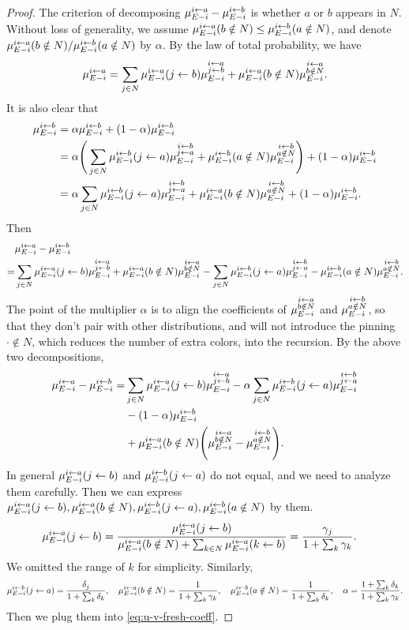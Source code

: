 \begin{proof}
    The criterion of decomposing $\ma-\mb$ is whether
    $a$ or $b$ appears in $N$.
    Without loss of generality, we assume $\pan\le\pbn$,
    and denote $\pan/\pbn$ by $\alpha$.
    By the law of total probability, we have
    \begin{align}
        \ma = \sjn\pab\mab + \pan\man.
    \end{align}
    It is also clear that
    \begin{align*}
        \mb
          &= \alpha \mb + (1-\alpha) \mb
        \\&= \alpha \Bigg(\sjn\pba\mba + \pbn\mbn\Bigg)
         + (1-\alpha) \mb
        \\&= \alpha \sjn\pba\mba + \pan\mbn + (1-\alpha)\mb.
    \end{align*}
    Then
    \begin{align*}
        &\ma - \mb
        \\=&\sjn \pab\mab + \pan \man -\sjn\pba\mba-\pbn\mbn.
    \end{align*}
    The point of the multiplier $\alpha$ is to align the coefficients
    of $\man$ and $\mbn$, so that they don't pair with other distributions,
    and will not introduce the pinning $\cdot\notin N$, which reduces the 
    number of extra colors, into the recursion.
    By the above two decompositions,
    \begin{align}
           \ma - \mb
          =&\sjn\pab\mab - \alpha\sjn\pba\mba
            \notag
        \\&-(1-\alpha)\mb
            \notag
        \\&+\pan\Bigg(\man-\mbn\Bigg).
        \label{eq:u-v-fresh-coeff}
    \end{align}
    In general $\pab$ and $\pba$ do not equal, and we need to analyze them carefully.
    Then we can express $\pab,\pan,\pba,\pbn$ by them.
    \begin{align*}
          \pab &= \frac{\pab}{\pan+\sum_{k\in N} \ma(k\pin b)} = \frac{\gamma_j}{1+\sum_k\gamma_{k}}.
    \end{align*}
    We omitted the range of $k$ for simplicity.
    Similarly,
    \begin{align*}
             \pba = \frac{\delta_j}{1+\sum_{k}\delta_k},
       \quad \pan = \frac{1}{1+\sum_k\gamma_k},
       \quad \pbn = \frac{1}{1+\sum_k\delta_k},
       \quad \alpha = \frac{1+\sum_k\delta_k}{1+\sum_k\gamma_k}.
    \end{align*}
    Then we plug them into \cref{eq:u-v-fresh-coeff}.

\end{proof}

